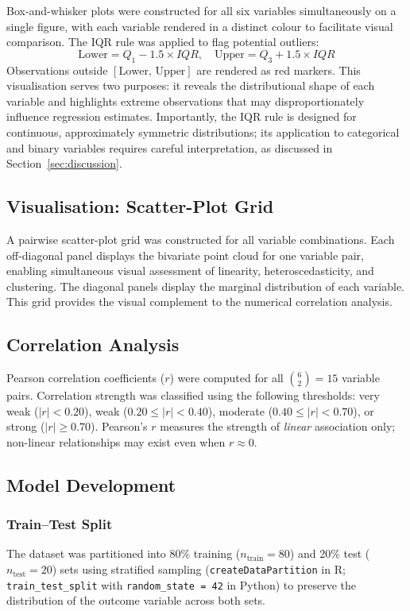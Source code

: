 ﻿\documentclass[conference]{IEEEtran}
\begin{document}
Box-and-whisker plots were constructed for all six variables simultaneously on a single figure, with each variable rendered in a distinct colour to facilitate visual comparison. The IQR rule was applied to flag potential outliers:
\begin{equation}
  \text{Lower} = Q_1 - 1.5 \times IQR, \quad \text{Upper} = Q_3 + 1.5 \times IQR
  \label{eq:iqr}
\end{equation}
Observations outside $[\text{Lower},\,\text{Upper}]$ are rendered as red markers. This visualisation serves two purposes: it reveals the distributional shape of each variable and highlights extreme observations that may disproportionately influence regression estimates. Importantly, the IQR rule is designed for continuous, approximately symmetric distributions; its application to categorical and binary variables requires careful interpretation, as discussed in Section~\ref{sec:discussion}.

\subsection{Visualisation: Scatter-Plot Grid}

A pairwise scatter-plot grid was constructed for all variable combinations. Each off-diagonal panel displays the bivariate point cloud for one variable pair, enabling simultaneous visual assessment of linearity, heteroscedasticity, and clustering. The diagonal panels display the marginal distribution of each variable. This grid provides the visual complement to the numerical correlation analysis.

\subsection{Correlation Analysis}

Pearson correlation coefficients ($r$) were computed for all $\binom{6}{2} = 15$ variable pairs. Correlation strength was classified using the following thresholds: very weak ($|r|<0.20$), weak ($0.20\leq|r|<0.40$), moderate ($0.40\leq|r|<0.70$), or strong ($|r|\geq0.70$). Pearson's $r$ measures the strength of \emph{linear} association only; non-linear relationships may exist even when $r \approx 0$.

\subsection{Model Development}

\subsubsection{Train--Test Split}
The dataset was partitioned into 80\% training ($n_{\text{train}}=80$) and 20\% test ($n_{\text{test}}=20$) sets using stratified sampling (\texttt{createDataPartition} in R; \texttt{train\_test\_split} with \texttt{random\_state\,=\,42} in Python) to preserve the distribution of the outcome variable across both sets.
\end{document}

